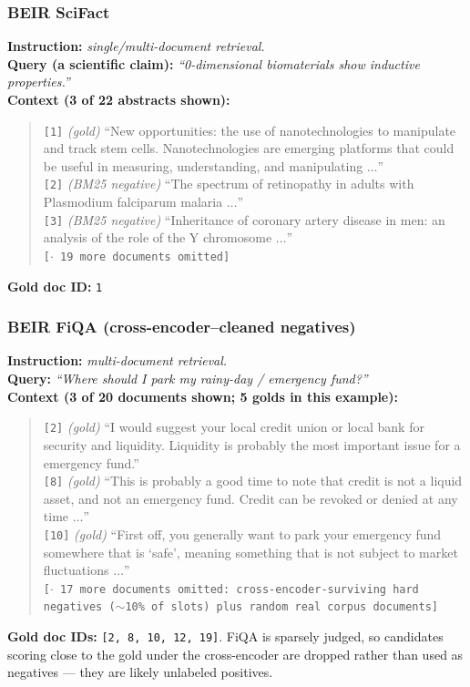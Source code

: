\subsubsection{BEIR SciFact}

\textbf{Instruction:} \emph{single/multi-document retrieval.}\\
\textbf{Query (a scientific claim):} \emph{``0-dimensional biomaterials show inductive
properties.''}\\
\textbf{Context (3 of 22 abstracts shown):}
\begin{quote}\small
\texttt{[1]} \emph{(gold)} ``New opportunities: the use of nanotechnologies to manipulate and track
stem cells. Nanotechnologies are emerging platforms that could be useful in measuring,
understanding, and manipulating $\dots$''\\
\texttt{[2]} \emph{(BM25 negative)} ``The spectrum of retinopathy in adults with Plasmodium
falciparum malaria $\dots$''\\
\texttt{[3]} \emph{(BM25 negative)} ``Inheritance of coronary artery disease in men: an analysis of
the role of the Y chromosome $\dots$''\\
\texttt{[$\cdot$ 19 more documents omitted]}
\end{quote}
\textbf{Gold doc ID:} \texttt{1}

\subsubsection{BEIR FiQA (cross-encoder--cleaned negatives)}

\textbf{Instruction:} \emph{multi-document retrieval.}\\
\textbf{Query:} \emph{``Where should I park my rainy-day / emergency fund?''}\\
\textbf{Context (3 of 20 documents shown; 5 golds in this example):}
\begin{quote}\small
\texttt{[2]} \emph{(gold)} ``I would suggest your local credit union or local bank for security and
liquidity. Liquidity is probably the most important issue for a emergency fund.''\\
\texttt{[8]} \emph{(gold)} ``This is probably a good time to note that credit is not a liquid asset,
and not an emergency fund. Credit can be revoked or denied at any time $\dots$''\\
\texttt{[10]} \emph{(gold)} ``First off, you generally want to park your emergency fund somewhere
that is `safe', meaning something that is not subject to market fluctuations $\dots$''\\
\texttt{[$\cdot$ 17 more documents omitted: cross-encoder-surviving hard negatives ($\sim$10\% of
slots) plus random real corpus documents]}
\end{quote}
\textbf{Gold doc IDs:} \texttt{[2, 8, 10, 12, 19]}. FiQA is sparsely judged, so candidates scoring
close to the gold under the cross-encoder are dropped rather than used as negatives --- they are
likely unlabeled positives.

